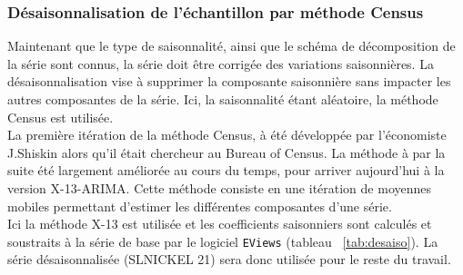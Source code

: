 \subsubsection{Désaisonnalisation de l'échantillon par méthode Census}
Maintenant que le type de saisonnalité, ainsi que le schéma de décomposition de la série sont connus, la série doit être corrigée des variations saisonnières. La 
désaisonnalisation vise à supprimer la composante saisonnière sans impacter les autres composantes de la série. Ici, la saisonnalité étant aléatoire, la méthode Census
est utilisée.\\[11pt]
La première itération de la méthode Census, à été développée par l'économiste J.Shiskin alors qu'il était chercheur au Bureau of Census. La méthode à par la suite été 
largement améliorée au cours du temps, pour arriver aujourd'hui à la version X-13-ARIMA. Cette méthode consiste en une itération de moyennes mobiles permettant d'estimer
les différentes composantes d'une série.\\[11pt]
Ici la méthode X-13 est utilisée et les coefficients saisonniers sont calculés et soustraits à la série de base par le logiciel \texttt{EViews} 
(tableau ~\ref{tab:desaiso}). La série désaisonnalisée (SLNICKEL 21) sera donc utilisée pour le reste du travail.

